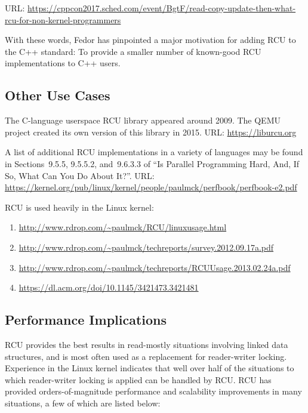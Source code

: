 URL: {\scriptsize \url{https://cppcon2017.sched.com/event/BgtF/read-copy-update-then-what-rcu-for-non-kernel-programmers}}

With these words, Fedor has pinpointed a major motivation for adding
RCU to the C++ standard: To provide a smaller number of known-good RCU
implementations to C++ users.

\subsection{Other Use Cases}
\label{sec:Other Use Cases}

The C-language userspace RCU library appeared around 2009.
The QEMU project created its own version of this library in 2015.
URL: \url{https://liburcu.org}

A list of additional RCU implementations in a variety of languages
may be found in Sections~9.5.5, 9.5.5.2, and~9.6.3.3 of
``Is Parallel Programming Hard, And, If So, What Can You Do About It?''.
URL: \url{https://kernel.org/pub/linux/kernel/people/paulmck/perfbook/perfbook-e2.pdf}

RCU is used heavily in the Linux kernel:

\begin{enumerate}
\item	\url{http://www.rdrop.com/~paulmck/RCU/linuxusage.html}
\item	\url{http://www.rdrop.com/~paulmck/techreports/survey.2012.09.17a.pdf}
\item	\url{http://www.rdrop.com/~paulmck/techreports/RCUUsage.2013.02.24a.pdf}
\item	\url{https://dl.acm.org/doi/10.1145/3421473.3421481}
\end{enumerate}

\subsection{Performance Implications}
\label{sec:Performance Implications}

RCU provides the best results in read-mostly situations involving linked
data structures, and is most often used as a replacement for reader-writer
locking.
Experience in the Linux kernel indicates that well over half of the
situations to which reader-writer locking is applied can be handled
by RCU.
RCU has provided orders-of-magnitude performance and scalability
improvements in many situations, a few of which are listed below:

